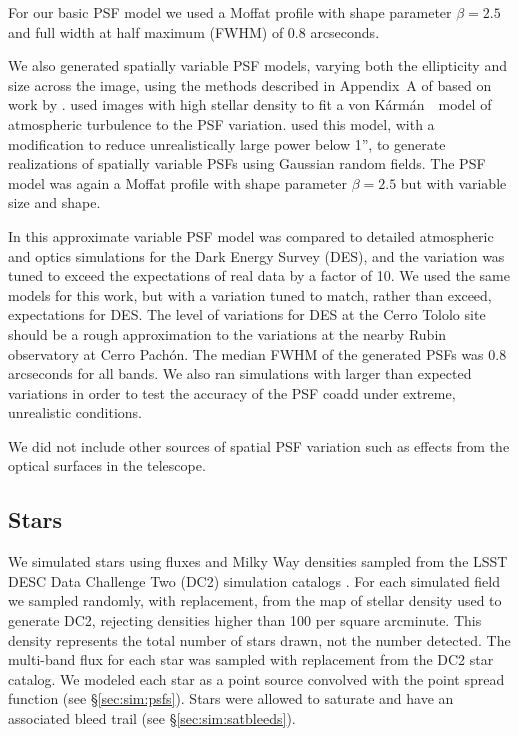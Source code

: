 \documentclass[twocolumn,twocolappendix,astrosym]{openjournal}
\newcommand{\vonkarman}{{von K\'arm\'an}~}
\begin{document}
For our basic PSF model we used a Moffat profile \citep{Moffat1969} with shape
parameter $\beta=2.5$ and full width at half maximum (FWHM) of 0.8 arcseconds.

We also generated spatially variable PSF models, varying both the ellipticity
and size across the image, using the methods described in Appendix~A of
\citet{mdet20} based on work by \citet{heymans2012}.  \citet{heymans2012} used
images with high stellar density to fit a \vonkarman\ model of atmospheric
turbulence to the PSF variation. \citet{mdet20} used this model, with a
modification to reduce unrealistically large power below 1'', to generate
realizations of spatially variable PSFs using Gaussian random fields. The PSF
model was again a Moffat profile with shape parameter $\beta=2.5$ but with
variable size and shape.

In \citet{mdet20} this approximate variable PSF model was compared to detailed
atmospheric and optics simulations for the Dark Energy Survey (DES), and the
variation was tuned to exceed the expectations of real data by a factor of 10.
We used the same models for this work, but with a variation tuned to match,
rather than exceed, expectations for DES.  The level of variations for DES at
the Cerro Tololo site should be a rough approximation to the variations at the
nearby Rubin observatory at Cerro Pachón.  The median FWHM of the generated
PSFs was 0.8 arcseconds for all bands.  We also ran simulations with larger
than expected variations in order to test the accuracy of the PSF coadd under
extreme, unrealistic conditions.

We did not include other sources of spatial PSF variation such as effects from
the optical surfaces in the telescope.

\subsection{Stars} \label{sec:sim:stars}

We simulated stars using fluxes and Milky Way densities sampled from the LSST
DESC Data Challenge Two (DC2) simulation catalogs \citep{DC2Abolfathi2021}.
For each simulated field we sampled randomly, with replacement, from the map of
stellar density used to generate DC2, rejecting densities higher than 100 per
square arcminute.  This density represents the total number of stars drawn, not
the number detected.  The multi-band flux for each star was sampled with
replacement from the DC2 star catalog.  We modeled each star as a point
source convolved with the point spread function
(see \S \ref{sec:sim:psfs}).  Stars were allowed to saturate and have an
associated bleed trail (see \S \ref{sec:sim:satbleeds}).
\end{document}
